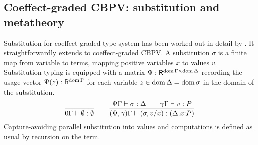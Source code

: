 \documentclass[acmsmall,review,anonymous]{acmart}\settopmatter{printfolios=true,printccs=false,printacmref=false}
\theoremstyle{remark}
\begin{document}



\subsection{Coeffect-graded CBPV: substitution and metatheory}
\label{sec:subst}

Substitution for coeffect-graded type system has been worked
out in detail by \citet{atkeyWood:types19,woodAtkey:linearity20}.
It straightforwardly extends to coeffect-graded CBPV.
%
A substitution $\sigma$ is a finite map from variable to terms,
mapping positive variables $x$ to values $v$.
Substitution typing
\fbox{$\SubstTy \Psi \Gamma \sigma \Delta$} is equipped with a matrix
$\Psi : \R^{\dom\Gamma \times \dom\Delta}$ recording the usage
vector $\Psi(z) : \R^{\dom\Gamma}$ for each variable
$z \in \dom\Delta = \dom \sigma$ in the domain of the substitution.
\[
  \ru{
    }{\SubstTy {0} \Gamma \sempty \cempty}
\qquad
  \ru{\SubstTy \Psi \Gamma \sigma \Delta \qquad
      \qValTy \gamma \Gamma v P
    }{\pSubstTy {\Psi,\gamma} \Gamma {\sext \sigma x v} {\ext \Delta x P}}
\]
Capture-avoiding parallel substitution into values  and
computations  is defined as usual by recursion on the term.
\end{document}
